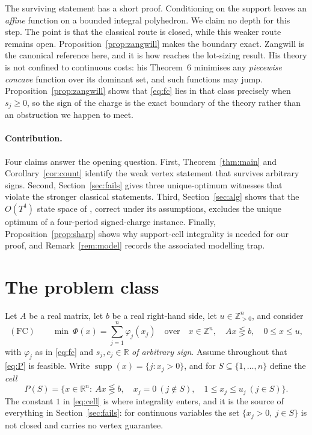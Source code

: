 \documentclass[3p,11pt]{elsarticle}
\theoremstyle{remark}
\theoremstyle{definition}
\newcommand{\R}{\mathbb{R}}
\newcommand{\Z}{\mathbb{Z}}
\newcommand{\supp}{\operatorname{supp}}
\begin{document}
The surviving statement has a short proof. Conditioning on the support leaves an
\emph{affine} function on a bounded integral polyhedron. We claim no depth for this step.
The point is that the classical route is closed, while this weaker route remains open.
Proposition~\ref{prop:zangwill} makes the boundary exact.
Zangwill \cite{zangwill67} is the canonical reference here, and it is how \cite{love73}
reaches the lot-sizing result. His theory is not confined to continuous costs: his
Theorem~6 minimises any \emph{piecewise concave} function over its dominant set, and such
functions may jump. Proposition~\ref{prop:zangwill} shows that \eqref{eq:fc} lies in that
class precisely when $s_j\ge0$, so the sign of the charge is the exact boundary of the
theory rather than an obstruction we happen to meet.

\paragraph{Contribution.} Four claims answer the opening question. First,
Theorem~\ref{thm:main} and Corollary~\ref{cor:count} identify the weak vertex statement
that survives arbitrary signs. Second, Section~\ref{sec:fails} gives three
unique-optimum witnesses that violate the stronger classical statements. Third,
Section~\ref{sec:alg} shows that the $O(T^4)$ state space of \cite{apr15}, correct under
its assumptions, excludes the unique optimum of a four-period signed-charge instance.
Finally, Proposition~\ref{prop:sharp} shows why support-cell integrality is needed for our
proof, and Remark~\ref{rem:model} records the associated modelling trap.

\section{The problem class}

Let $A$ be a real matrix, let $b$ be a real right-hand side, let
$u\in\Z_{>0}^n$, and consider
\begin{equation}\label{eq:P}
(\mathrm{FC})\qquad
\min\ \Phi(x)=\sum_{j=1}^{n}\varphi_j(x_j)
\quad\text{over}\quad x\in\Z^n,\quad Ax\lesseqgtr b,\quad 0\le x\le u,
\end{equation}
with $\varphi_j$ as in \eqref{eq:fc} and $s_j,c_j\in\R$ \emph{of arbitrary sign}.
Assume throughout that \eqref{eq:P} is feasible.
Write $\supp(x)=\{j:x_j>0\}$, and for $S\subseteq\{1,\dots,n\}$ define the \emph{cell}
\begin{equation}\label{eq:cell}
P(S)=\bigl\{x\in\R^n:\ Ax\lesseqgtr b,\quad x_j=0\ (j\notin S),\quad 1\le x_j\le u_j\ (j\in S)\bigr\}.
\end{equation}
The constant $1$ in \eqref{eq:cell} is where integrality enters, and it is the source of
everything in Section~\ref{sec:fails}: for continuous variables the set
$\{x_j>0,\ j\in S\}$ is not closed and carries no vertex guarantee.
\end{document}
